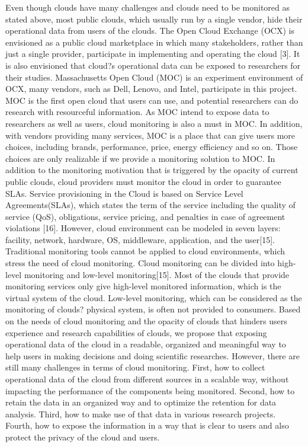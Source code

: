 Even though clouds have many challenges and clouds need to be monitored as stated above, most public clouds, which usually run by a single vendor, hide their operational data from users of the clouds. The Open Cloud Exchange (OCX) is envisioned as a public cloud marketplace in which many stakeholders, rather than just a single provider, participate in implementing and operating the cloud [3]. It is also envisioned that cloud?s operational data can be exposed to researchers for their studies. Massachusetts Open Cloud (MOC) is an experiment environment of OCX, many vendors, such as Dell, Lenovo, and Intel, participate in this project. MOC is the first open cloud that users can use, and potential researchers can do research with resourceful information. As MOC intend to expose data to researchers as well as users, cloud monitoring is also a must in MOC. In addition, with vendors providing many services, MOC is a place that can give users more choices, including brands, performance, price, energy efficiency and so on. Those choices are only realizable if we provide a monitoring solution to MOC. 
In addition to the monitoring motivation that is triggered by the opacity of current public clouds, cloud providers must monitor the cloud in order to guarantee SLAs. Service provisioning in the Cloud is based on Service Level Agreements(SLAs), which states the term of the service including the quality of service (QoS), obligations, service pricing, and penalties in case of agreement violations [16]. However, cloud environment can be modeled in seven layers: facility, network, hardware, OS, middleware, application, and the user[15]. Traditional monitoring tools cannot be applied to cloud environments, which stress the need of cloud monitoring.
Cloud monitoring can be divided into high-level monitoring and low-level monitoring[15]. Most of the clouds that provide monitoring services only give high-level monitored information, which is the virtual system of the cloud. Low-level monitoring, which can be considered as the monitoring of clouds? physical system, is often not provided to consumers.
Based on the needs of cloud monitoring and the opacity of clouds that hinders users experience and research capabilities of clouds, we propose that exposing operational data of the cloud in a readable, organized and meaningful way to help users in making decisions and doing scientific researches. However, there are still many challenges in terms of cloud monitoring. First, how to collect operational data of the cloud from different sources in a scalable way, without impacting the performance of the components being monitored. Second, how to retain the data in an organized way and to optimize the retention for data analysis. Third, how to make use of that data in various research projects. Fourth, how to expose the information in a way that is clear to users and also protect the privacy of the cloud and users. 

